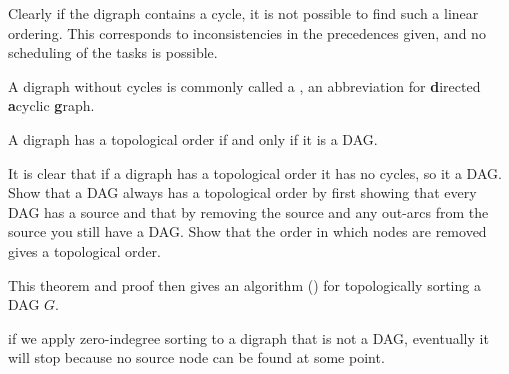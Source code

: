 %


Clearly if the digraph contains a cycle, it is not possible to find
such a linear ordering. This corresponds to inconsistencies in the
precedences given, and no scheduling of the tasks is possible.

\begin{Definition}
A digraph without cycles is commonly called a , an
abbreviation for \textbf{d}irected \textbf{a}cyclic
\textbf{g}raph.  
\end{Definition}


\begin{Theorem}
\label{thm:topDAG}
A digraph has a topological order if and only if it is a DAG.
\end{Theorem}

\begin{Boxample}[6]
It is clear that if a digraph has a topological order it has no cycles, so it a DAG. Show that a DAG always has a topological order by first showing that every DAG has a source and that by removing the source and any out-arcs from the source you still have a DAG. Show that the order in which nodes are removed gives a topological order.
\end{Boxample}

This theorem and proof then gives an algorithm ()
for topologically sorting a DAG $G$.

if we apply zero-indegree sorting to a digraph that is not
a DAG, eventually it will stop because no source node can be found at
some point.

%


